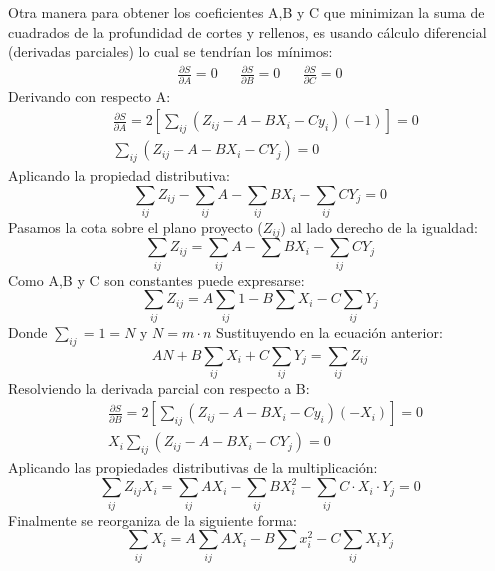 Otra manera para obtener los coeficientes A,B y C que minimizan la suma de cuadrados de la profundidad de cortes y rellenos, es usando cálculo diferencial (derivadas parciales) lo cual se tendrían los mínimos:
\begin{align}
    \frac{\partial S}{\partial A} = 0&& \frac{\partial S}{\partial B} = 0&& \frac{\partial S}{\partial C} = 0
  \end{align}
Derivando con respecto A:
\begin{align*}
    &\frac{\partial S}{\partial A} = 2\left[\sum_{ij}\left(Z_{ij} - A- BX_i - Cy_i \right)( - 1)  \right] = 0\\
    &\sum_{ij}\left(Z_{ij} - A - BX_i - CY_j \right) = 0
\end{align*}
Aplicando la propiedad distributiva:
\begin{equation*}
    \sum_{ij} Z_{ij} - \sum_{ij} A - \sum_{ij} BX_i - \sum_{ij} CY_j = 0
\end{equation*}
Pasamos la cota sobre el plano proyecto ($Z_{ij}$) al lado derecho de la igualdad:
\begin{equation*}
    \sum_{ij} Z_{ij} = \sum_{ij}A - \sum BX_i - \sum_{ij} CY_j
\end{equation*}
Como A,B y C son constantes puede expresarse:
\begin{equation*}
    \sum_{ij} Z_{ij} = A\sum_{ij} 1 - B\sum X_i - C\sum_{ij} Y_{j}
\end{equation*}
Donde $\sum_{ij}= 1= N$  y $N=m\cdot n$
Sustituyendo en la ecuación anterior:
\begin{equation*}
    AN + B\sum_{ij} X_i + C \sum_{ij} Y_j = \sum_{ij} Z_{ij}
\end{equation*}
Resolviendo la derivada parcial con respecto a B:
\begin{align*}
    &\frac{\partial S}{\partial B} = 2\left[\sum_{ij}\left(Z_{ij} - A- BX_i - Cy_i \right)( - X_i)  \right] = 0\\
    &X_i\sum_{ij}\left(Z_{ij} - A - BX_i - CY_j \right) = 0
\end{align*}
Aplicando las propiedades distributivas de la multiplicación:
\begin{equation*}
    \sum_{ij} Z_{ij} X_i = \sum_{ij} AX_i - \sum_{ij} BX_i^2 - \sum_{ij} C\cdot X_i\cdot Y_j = 0
\end{equation*}
Finalmente se reorganiza de la siguiente forma:
\begin{equation*}
    \sum_{ij} X_{i} = A\sum_{ij} AX_i - B\sum x^2_i - C\sum_{ij} X_i Y_{j}
\end{equation*}
